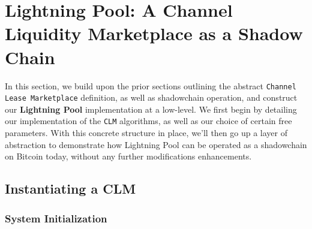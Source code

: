 \documentclass[10pt,a4paper]{article}
\theoremstyle{definition}
\begin{document}
\begin{pchstack}[boxed,center, space=1em]
 \end{pchstack}



\section{Lightning Pool: A Channel Liquidity Marketplace as a Shadow Chain}

In this section, we build upon the prior sections outlining the abstract
\texttt{Channel Lease Marketplace} definition, as well as shadowchain
operation, and construct our \textbf{Lightning Pool} implementation at a
low-level. We first begin by detailing our implementation of the \texttt{CLM}
algorithms, as well as our choice of certain free parameters. With this
concrete structure in place, we'll then go up a layer of abstraction to
demonstrate how Lightning Pool can be operated as a shadowchain on Bitcoin
today, without any further modifications enhancements.

\subsection{Instantiating a CLM}

\subsubsection{System Initialization}
\end{document}
